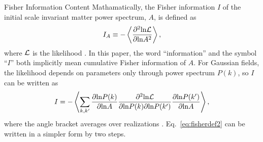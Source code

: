 \begin{section}{Fisher Information Content}
  \label{sec:fisherinfo}
  Mathamatically, the Fisher information $I$ of the initial scale
  invariant matter power spectrum, $A$, is defined as
  \begin{align}
    I_A \equiv -\left\langle \frac{\partial ^2 \mathrm{ln \mathcal{L}}}{\partial  \mathrm{ln} A ^2}\right\rangle,
    \label{eq:fisherdefine}
  \end{align}
  where $\mathcal{L}$ is the likelihood \cite{bib:Tegmark1997}.  
  In this paper, the word \enquote{information} and the symbol \enquote{$I$} both implicitly 
  mean cumulative Fisher information 
  of $A$. For Gaussian
  fields, the likelihood depends on parameters only through
  power spectrum $P(k)$, so $I$ can be written as 
  \begin{align}
    I = - \left\langle \sum_{k,k'} \frac{\partial \mathrm{ln} P(k)}{\partial \mathrm{ln} A} 
    \frac{\partial ^2 \mathrm{ln \mathcal{L}}}{\partial \mathrm{ln} P(k) \partial \mathrm{ln} P(k')}
    \frac{\partial \mathrm{ln} P(k')}{\partial \mathrm{ln} A}\right\rangle,
    \label{eq:fisherdef2}
  \end{align}
  where the angle bracket averages over realizations
  \cite{bib:Rimes2006}.
  Eq.~\ref{eq:fisherdef2} can be written in a simpler
  form by two steps.   
  

\end{section}
